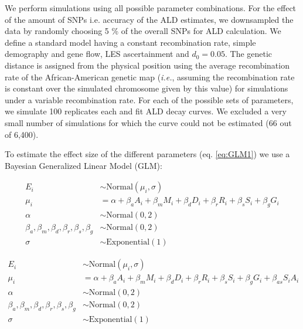 \documentclass[11pt]{article}
\begin{document}
We perform simulations using all possible parameter combinations. For the effect of the amount of SNPs i.e. accuracy of the ALD estimates, we downsampled the data by randomly choosing 5 \% of the overall SNPs for ALD calculation.
We define a standard model having a constant recombination rate, simple demography and gene flow, LES ascertainment and $d_0 = 0.05$.
The genetic distance is assigned from the physical  position using the average recombination rate of the African-American genetic map (\emph{i.e.}, assuming the recombination rate is constant over the simulated chromosome given by this value) for simulations under a variable recombination rate.
For each of the possible sets of parameters, we simulate 100 replicates each and fit ALD decay curves. We excluded a very small number of simulations for which the curve could not be estimated (66 out of 6,400). 



To estimate the effect size of the different parameters (eq.
\ref{eq:GLM1}) we use a Bayesian Generalized Linear Model (GLM):

\begin{equation}\label{eq:GLM1}
\begin{split}
E_i &\sim \text{Normal}(\mu_i,\sigma) \\
\mu_i &= \alpha + \beta_aA_i + \beta_mM_i + \beta_dD_i + \beta_rR_i + \beta_{s}S_i + \beta_gG_i \\
\alpha &\sim \text{Normal}(0,2) \\
\beta_a,\beta_m,\beta_d,\beta_r,\beta_{s},\beta_g &\sim \text{Normal}(0,2) \\
\sigma &\sim \text{Exponential}(1)
\end{split}
\end{equation}

\begin{equation}\label{eq:GLM2}
\begin{split}
E_i &\sim \text{Normal}(\mu_i,\sigma) \\
\mu_i &= \alpha + \beta_aA_i + \beta_mM_i + \beta_dD_i + \beta_rR_i + \beta_{s}S_i + \beta_gG_i + \beta_{as}S_i A_i\\
\alpha &\sim \text{Normal}(0,2) \\
\beta_a,\beta_m,\beta_d,\beta_r,\beta_{s},\beta_g &\sim \text{Normal}(0,2) \\
\sigma &\sim \text{Exponential}(1)
\end{split}
\end{equation}
\end{document}
